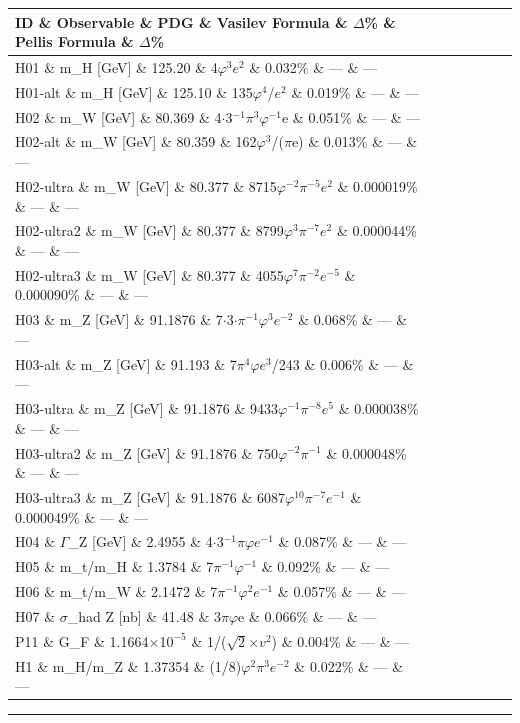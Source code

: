 \begin{tabular}{|l|l|l|l|l|l|l|}
\hline
ID \& Observable \& PDG \& Vasilev Formula \& $\Delta$\% \& Pellis Formula \& $\Delta$\% \\
\hline
H01 \& m\_H [GeV] \& 125.20 \& 4$\varphi^{3}$$e^{2}$ \& 0.032\% \& --- \& --- \\
H01-alt \& m\_H [GeV] \& 125.10 \& 135$\varphi^{4}$/$e^{2}$ \& 0.019\% \& --- \& --- \\
H02 \& m\_W [GeV] \& 80.369 \& 4$\cdot$3$^{-1}\pi^{3}\varphi^{-1}$e \& 0.051\% \& --- \& --- \\
H02-alt \& m\_W [GeV] \& 80.359 \& 162$\varphi^{3}$/($\pi$e) \& 0.013\% \& --- \& --- \\
H02-ultra \& m\_W [GeV] \& 80.377 \& 8715$\varphi^{-2}\pi^{-5}$$e^{2}$ \& 0.000019\% \& --- \& --- \\
H02-ultra2 \& m\_W [GeV] \& 80.377 \& 8799$\varphi^{3}\pi^{-7}$$e^{2}$ \& 0.000044\% \& --- \& --- \\
H02-ultra3 \& m\_W [GeV] \& 80.377 \& 4055$\varphi^{7}\pi^{-2}$$e^{-5}$ \& 0.000090\% \& --- \& --- \\
H03 \& m\_Z [GeV] \& 91.1876 \& 7$\cdot$3$\cdot\pi^{-1}\varphi^{3}$$e^{-2}$ \& 0.068\% \& --- \& --- \\
H03-alt \& m\_Z [GeV] \& 91.193 \& 7$\pi^{4}\varphi$$e^{3}$/243 \& 0.006\% \& --- \& --- \\
H03-ultra \& m\_Z [GeV] \& 91.1876 \& 9433$\varphi^{-1}\pi^{-8}$$e^{5}$ \& 0.000038\% \& --- \& --- \\
H03-ultra2 \& m\_Z [GeV] \& 91.1876 \& 750$\varphi^{-2}\pi^{-1}$ \& 0.000048\% \& --- \& --- \\
H03-ultra3 \& m\_Z [GeV] \& 91.1876 \& 6087$\varphi^{10}\pi^{-7}$$e^{-1}$ \& 0.000049\% \& --- \& --- \\
H04 \& $\Gamma$\_Z [GeV] \& 2.4955 \& 4$\cdot$3$^{-1}\pi\varphi$$e^{-1}$ \& 0.087\% \& --- \& --- \\
H05 \& m\_t/m\_H \& 1.3784 \& 7$\pi^{-1}\varphi^{-1}$ \& 0.092\% \& --- \& --- \\
H06 \& m\_t/m\_W \& 2.1472 \& 7$\pi^{-1}\varphi^{2}$$e^{-1}$ \& 0.057\% \& --- \& --- \\
H07 \& $\sigma$\_had Z [nb] \& 41.48 \& 3$\pi\varphi$e \& 0.066\% \& --- \& --- \\
P11 \& G\_F \& 1.1664$\times$1$0^{-5}$ \& 1/($\sqrt{2}$$\times$$v^{2}$) \& 0.004\% \& --- \& --- \\
H1 \& m\_H/m\_Z \& 1.37354 \& (1/8)$\varphi^{2}\pi^{3}$$e^{-2}$ \& 0.022\% \& --- \& --- \\
\hline
\end{tabular}
\noindent\rule{\textwidth}{0.4pt}

